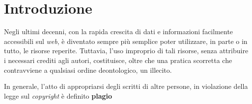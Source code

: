 \chapter{Introduzione}
Negli ultimi decenni, con la rapida crescita di dati e informazioni facilmente accessibili sul \textit{web}, è diventato sempre più semplice poter utilizzare, in parte o in tutto, le risorse reperite.
%
Tuttavia, l'uso improprio di tali risorse, senza attribuire i necessari crediti agli autori, costituisce, oltre che una pratica scorretta che contravviene a qualsiasi ordine deontologico, un illecito. 

In generale, l'atto di appropriarsi degli scritti di altre persone, in violazione della legge sul \textit{copyright} è definito \textbf{plagio} \cite{britannica}

